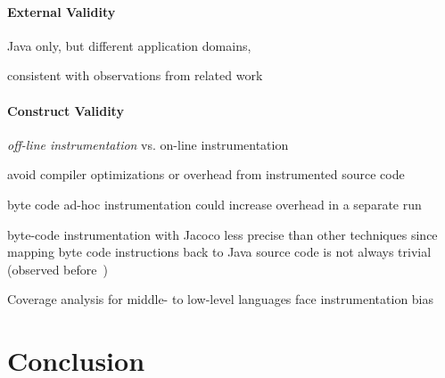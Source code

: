 \paragraph{External Validity}\label{sec:external_validity}
\begin{compactitem}
	\item Java only, but different application domains,
	\item consistent with observations from related work
\end{compactitem}

\paragraph{Construct Validity}\label{sec:construct_validity}
\begin{compactitem}
	\item \textit{off-line instrumentation} vs. on-line instrumentation
	\begin{compactitem}
		\item avoid compiler optimizations or overhead from instrumented source code
		\item byte code ad-hoc instrumentation could increase overhead in a separate run
		\item byte-code instrumentation with Jacoco less precise than other techniques since mapping byte code instructions back to Java source code is not always trivial (observed before~\cite{luo_2019_cova})
	\end{compactitem}
	\item Coverage analysis for middle- to low-level languages face instrumentation bias
\end{compactitem}

\section{Conclusion}
